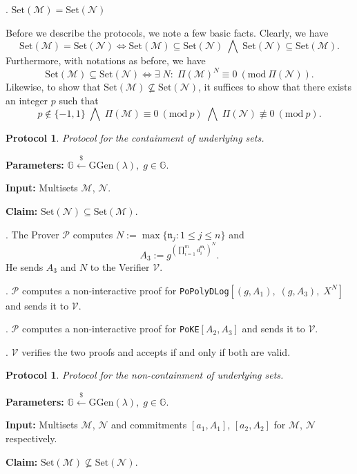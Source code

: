 \documentclass[11pt, lettersize, notitlepage, leqno, footskip=0.6cm]{article}
\newcommand{\pl}{\prod\limits}
\newcommand{\sett}{\mr{Set}}
\newcommand{\LRA}{\Longleftrightarrow}
\newcommand{\mf}{\mathfrak}
\newcommand{\mc}{\mathcal}
\newcommand{\mb}{\mathbb}
\newcommand{\mr}{\mathrm}
\newcommand{\lamb}{\lambda}
\newcommand{\sub}{\subseteq}
\newcommand{\nsub}{\nsubseteq}
\newcommand{\mP}{\mc{P}}
\newcommand{\V}{\mc{V}}
\newcommand{\vs}{\vspace{-0.15cm}}
\newcommand{\noin}{\noindent}
\newcommand{\Mod}[1]{\ (\mathrm{mod}\ #1)}
\newtheorem{Prot}[Thm]{Protocol}
\numberwithin{equation}{section}
\begin{document}
\noin 3. $\sett(\mc{M}) = \sett(\mc{N})$ \vspace{0.1cm}

\noin Before we describe the protocols, we note a few basic facts. Clearly, we have \vs $$\sett(\mc{M}) = \sett(\mc{N})\LRA \sett(\mc{M}) \sub \sett(\mc{N})\;\bigwedge\; \sett(\mc{N}) \sub \sett(\mc{M}).$$ Furthermore, with notations as before, we have \vs $$\sett(\mc{M})\sub \sett(\mc{N})\LRA \exists\; N:\;\Pi(\mc{M})^N\equiv 0\Mod{\Pi(\mc{N})}.$$ Likewise, to show that $\sett(\mc{M})\nsub \sett(\mc{N})$, it suffices to show that there exists an integer $p$ such that \vs $$p\notin \{-1,1\}   \;\bigwedge\;\Pi(\mc{M})\equiv 0\Mod{p} \;\bigwedge\; \Pi(\mc{N})\not\equiv 0\Mod{p}.$$ 


\begin{Prot} Protocol for the containment of underlying sets.\end{Prot} \vspace{-0.2cm}

\noin \textbf{Parameters:} $\mb{G}\xleftarrow{\$} \mr{GGen}(\lamb), \; g\in \mb{G}$.

\noin \textbf{Input:} Multisets $\mc{M}$, $\mc{N}$.

\noin \textbf{Claim:} $\sett(\mc{N})\sub \sett(\mc{M})$.

\noin 1. The Prover $\mP$ computes $N:= \max\{\mf{n}_j:1\leq j\leq n \}$ and \vs $$A_3:= g^{(\pl_{i=1}^m d_i^{\mf{m}_i})^N}.$$ He sends $A_3$ and $N$ to the Verifier $\V$.

\noin 2. $\mP$ computes a non-interactive proof for \verb|PoPolyDLog|$[(g, A_1),\;(g, A_3),\;X^N]$ and sends it to $\V$.

\noin 3. $\mP$ computes a non-interactive proof for \verb|PoKE|$[A_2,A_3]$ and sends it to $\V$.

\noin 4. $\V$ verifies the two proofs and accepts if and only if both are valid.

\bigskip

\begin{Prot} Protocol for the non-containment of underlying sets.\end{Prot}\vspace{-0.3cm}

\noin \textbf{Parameters:} $\mb{G}\xleftarrow{\$} \mr{GGen}(\lamb), \; g\in \mb{G}$. 

\noin \textbf{Input:} Multisets $\mc{M}$, $\mc{N}$ and commitments $[a_1, A_1]$, $[a_2, A_2]$ for $\mc{M}$, $\mc{N}$ respectively.

\noin \textbf{Claim:} $\sett(\mc{M})\nsub \sett(\mc{N})$.
\end{document}
